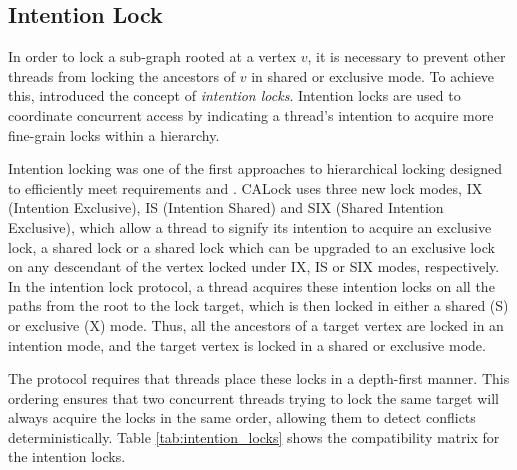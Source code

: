 \subsection{Intention Lock}

In order to lock a sub-graph rooted at a vertex $v$, it is necessary to prevent other threads from locking the ancestors of $v$ in shared or exclusive mode. To achieve this, \citet{gray1975granularity} introduced the concept of \emph{intention locks}. Intention locks are used to coordinate concurrent access by indicating a thread’s intention to acquire more fine-grain locks within a hierarchy. 



Intention locking was one of the first approaches to hierarchical locking designed to efficiently meet requirements \Rb and \Rc. CALock uses three new lock modes, IX (Intention Exclusive), IS (Intention Shared) and SIX (Shared Intention Exclusive), which allow a thread to signify its intention to acquire an exclusive lock, a shared lock or a shared lock which can be upgraded to an exclusive lock on any descendant of the vertex locked under IX, IS or SIX modes, respectively. In the intention lock protocol, a thread acquires these intention locks on all the paths from the root to the lock target, which is then locked in either a shared (S) or exclusive (X) mode. Thus, all the ancestors of a target vertex are locked in an intention mode, and the target vertex is locked in a shared or exclusive mode.

The protocol requires that threads place these locks in a depth-first manner. This ordering ensures that two concurrent threads trying to lock the same target will always acquire the locks in the same order, allowing them to detect conflicts deterministically. Table \ref{tab:intention_locks} shows the compatibility matrix for the intention locks.


